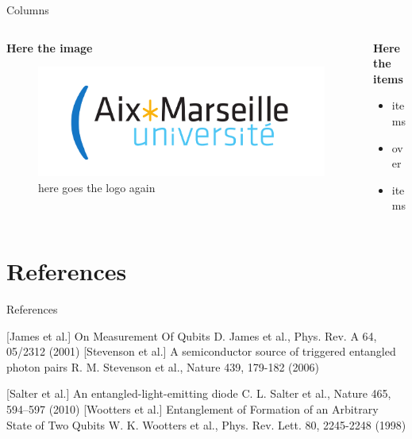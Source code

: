 \begin{frame}{Columns}
  \begin{columns}[T]
    \begin{column}{0.6\textwidth}
      \textbf{Here the image}
      \begin{figure}
        \includegraphics[width=\textwidth]{amu}
        \caption{here goes the logo again}
      \end{figure}
    \end{column}
    \begin{column}{0.4\textwidth}
      \textbf{Here the items}
      \begin{itemize}
        \item items
        \item over
        \item items
      \end{itemize}
    \end{column}
  \end{columns}
\end{frame}


\section{References}

\begin{frame}[plain]{References}
\begin{thebibliography}{xxxxxxxx}
  [James et al.] On Measurement Of Qubits
  \newblock D. James et al., Phys. Rev. A 64, 05/2312 (2001)
  [Stevenson et al.] A semiconductor source of triggered entangled photon pairs
  \newblock R. M. Stevenson et al., Nature 439, 179-182 (2006)

  [Salter et al.] An entangled-light-emitting diode
  \newblock C. L. Salter et al., Nature 465, 594–597 (2010)
  [Wootters et al.] Entanglement of Formation of an Arbitrary State of Two Qubits
  \newblock W. K. Wootters et al., Phys. Rev. Lett. 80, 2245-2248 (1998)
 \end{thebibliography}
\end{frame}
